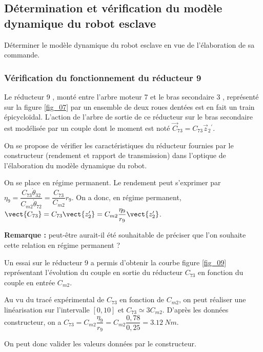\subsection{Détermination et vérification du modèle dynamique du robot esclave}
\begin{obj}
Déterminer le modèle dynamique du robot esclave en vue de l'élaboration de sa commande.
\end{obj}
\subsubsection{Vérification du fonctionnement du réducteur 9}

\ifprof
\else
Le réducteur 9 , monté entre l'arbre moteur 7 et le bras secondaire 3 , représenté sur la figure \ref{fig_07} par un ensemble de deux roues dentées est en fait un train épicycloïdal. L'action de l'arbre de sortie de ce réducteur sur le bras secondaire est modélisée par un couple dont le moment est noté $\vec{C}_{73}=C_{73} \vec{z}_{2}{ }^{\prime}$.

On se propose de vérifier les caractéristiques du réducteur fournies par le constructeur (rendement et rapport de transmission) dans l'optique de l'élaboration du modèle dynamique du robot.
\fi

\ifprof
\begin{corrige}
On se place en régime permanent. Le rendement peut s'exprimer par 
$\eta_9 =\dfrac{C_{73}\dot{\theta}_{32}}{C_{m2}\dot{\theta}_{72}}=\dfrac{C_{73}}{C_{m2}}r_9$. 
On a donc, en régime permanent, $\vect{C_{73}}=C_{73}\vect{z'_2}=C_{m2}\dfrac{\eta_9}{r_9}\vect{z'_2}$.


\textbf{Remarque :} peut-être aurait-il été souhaitable de préciser que l'on souhaite cette relation en régime permanent ?
\end{corrige}
\else
\fi


Un essai sur le réducteur 9 a permis d'obtenir la courbe figure \ref{fig_09} représentant l'évolution du couple en sortie du réducteur $C_{73}$ en fonction du couple en entrée $C_{m 2}$.\\
\ifprof
\begin{corrige}
Au vu du tracé expérimental de $C_{73}$ en fonction de $C_{m2}$, on peut réaliser une linéarisation sur l'intervalle $[0,10]$ et $C_{73}\simeq 3 C_{m2}$. 
D'après les données constructeur, on a $C_{73}=C_{m2}\dfrac{\eta_9}{r_9}=C_{m2}\dfrac{0,78}{0,25}=\SI{3,12}{Nm}$.

On peut donc valider les valeurs données par le constructeur.
\end{corrige}
\else
\fi


